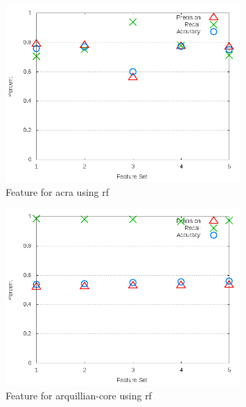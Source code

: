 \begin{figure}
\centering
\includegraphics[width=0.8\textwidth]{images/rf/test_3/acra_sample_range.png}
\caption{Feature for acra using \gls{rf}}
\label{fig:test_3_acra_rf}
\end{figure}

\begin{figure}
\centering
\includegraphics[width=0.8\textwidth]{images/rf/test_3/arquillian-core_sample_range.png}
\caption{Feature for arquillian-core using \gls{rf}}
\label{fig:test_3_arquillian-core_rf}
\end{figure}

\clearpage

